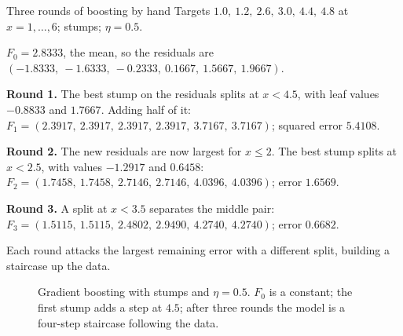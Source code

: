 \begin{workedexample}{Three rounds of boosting by hand}
Targets $1.0,\ 1.2,\ 2.6,\ 3.0,\ 4.4,\ 4.8$ at $x = 1,\dots,6$; stumps;
$\eta = 0.5$.

$F_0 = 2.8333$, the mean, so the residuals are
$(-1.8333,\ -1.6333,\ -0.2333,\ 0.1667,\ 1.5667,\ 1.9667)$.

\textbf{Round 1.} The best stump on the residuals splits at $x < 4.5$, with leaf
values $-0.8833$ and $1.7667$. Adding half of it:
$F_1 = (2.3917,\ 2.3917,\ 2.3917,\ 2.3917,\ 3.7167,\ 3.7167)$; squared error
$5.4108$.

\textbf{Round 2.} The new residuals are now largest for $x \le 2$. The best stump
splits at $x < 2.5$, with values $-1.2917$ and $0.6458$:
$F_2 = (1.7458,\ 1.7458,\ 2.7146,\ 2.7146,\ 4.0396,\ 4.0396)$; error $1.6569$.

\textbf{Round 3.} A split at $x < 3.5$ separates the middle pair:
$F_3 = (1.5115,\ 1.5115,\ 2.4802,\ 2.9490,\ 4.2740,\ 4.2740)$; error $0.6682$.

Each round attacks the largest remaining error with a different split, building
a staircase up the data.
\end{workedexample}

\begin{figure}[htbp]
  \centering
  \caption{Gradient boosting with stumps and $\eta = 0.5$. $F_0$ is a constant;
  the first stump adds a step at $4.5$; after three rounds the model is a
  four-step staircase following the data.}
  \label{fig:boosting}
\end{figure}

